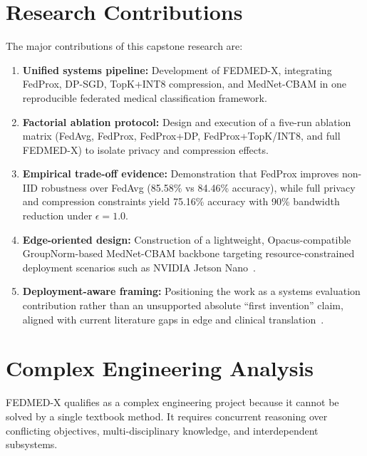 \section{Research Contributions}
The major contributions of this capstone research are:
\begin{enumerate}[leftmargin=*]
  \item \textbf{Unified systems pipeline:} Development of FEDMED-X,
        integrating FedProx, DP-SGD, TopK+INT8 compression, and MedNet-CBAM
        in one reproducible federated medical classification framework.
  \item \textbf{Factorial ablation protocol:} Design and execution of a
        five-run ablation matrix (FedAvg, FedProx, FedProx+DP,
        FedProx+TopK/INT8, and full FEDMED-X) to isolate privacy and
        compression effects.
  \item \textbf{Empirical trade-off evidence:} Demonstration that FedProx
        improves non-IID robustness over FedAvg (85.58\% vs 84.46\%
        accuracy), while full privacy and compression constraints yield
        75.16\% accuracy with 90\% bandwidth reduction under
        $\epsilon = 1.0$.
  \item \textbf{Edge-oriented design:} Construction of a lightweight,
        Opacus-compatible GroupNorm-based MedNet-CBAM backbone targeting
        resource-constrained deployment scenarios such as NVIDIA Jetson
        Nano~\cite{shabarinath2025efficacy}.
  \item \textbf{Deployment-aware framing:} Positioning the work as a systems
        evaluation contribution rather than an unsupported absolute ``first
        invention'' claim, aligned with current literature gaps in edge and
        clinical translation~\cite{ghosh2026advancements,zhou2025federated}.
\end{enumerate}

\section{Complex Engineering Analysis}
FEDMED-X qualifies as a complex engineering project because it cannot be
solved by a single textbook method. It requires concurrent reasoning over
conflicting objectives, multi-disciplinary knowledge, and interdependent
subsystems.


